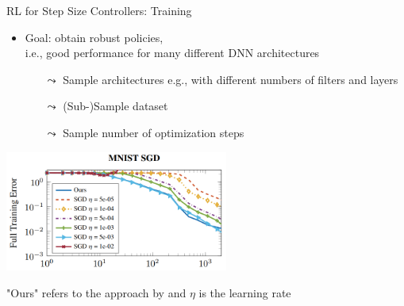 \begin{frame}[c]{RL for Step Size Controllers: Training }

\begin{itemize}
\item Goal: obtain robust policies,\\ i.e., good performance for many different DNN architectures
\begin{itemize}
\item[$\leadsto$] Sample architectures e.g., with different numbers of filters and layers
\item[$\leadsto$] (Sub-)Sample dataset
\item[$\leadsto$] Sample number of optimization steps
\end{itemize}
\end{itemize}

\pause 
\medskip
\centering
\includegraphics[width=0.55\textwidth]{images/l2stepsizecontroler_mnist_training.png}

"Ours" refers to the approach by  and $\eta$ is the learning rate

\end{frame}

